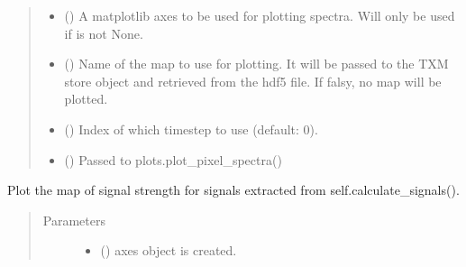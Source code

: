 \documentclass[letterpaper,10pt,english]{sphinxmanual}
\begin{document}
\begin{fulllineitems}
\begin{fulllineitems}
\begin{quote}
\begin{description}
\begin{itemize}
\item {} 
 () \textendash{} A matplotlib axes to be used for plotting spectra. Will only
be used if  is not None.

\item {} 
 (\sphinxstyleliteralemphasis{, }) \textendash{} Name of the map to use for plotting. It will be passed to
the TXM store object and retrieved from the hdf5 file. If
falsy, no map will be plotted.

\item {} 
 (\sphinxstyleliteralemphasis{, }) \textendash{} Index of which timestep to use (default: 0).

\item {} 
 (\sphinxstyleliteralemphasis{,}) \textendash{} Passed to plots.plot\_pixel\_spectra()

\end{itemize}

\end{description}\end{quote}

\end{fulllineitems}


\begin{fulllineitems}
\label{\detokenize{xanespy:xanespy.xanes_frameset.XanesFrameset.plot_mean_image}}
\end{fulllineitems}


\begin{fulllineitems}
\label{\detokenize{xanespy:xanespy.xanes_frameset.XanesFrameset.plot_signal_map}}
Plot the map of signal strength for signals extracted from
self.calculate\_signals().
\begin{quote}\begin{description}
\item[{Parameters}] \leavevmode\begin{itemize}
\item {} 
 (\sphinxstyleliteralemphasis{-}) \textendash{} axes object is created.


\end{itemize}
\end{description}
\end{quote}
\end{fulllineitems}
\end{fulllineitems}
\end{document}
